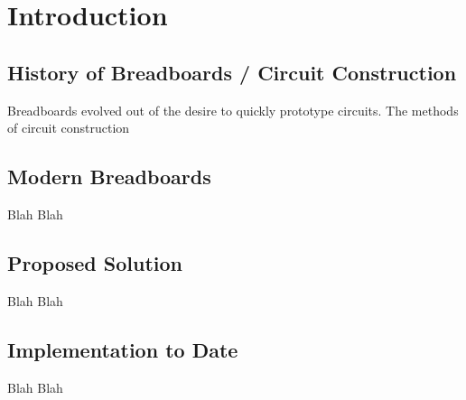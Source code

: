 \chapter{Introduction}



\section{History of Breadboards / Circuit Construction}

Breadboards evolved out of the desire to quickly prototype circuits.
The methods of circuit construction 

\section{Modern Breadboards}

Blah Blah

\section{Proposed Solution}

Blah Blah 

\section{Implementation to Date}

Blah Blah




